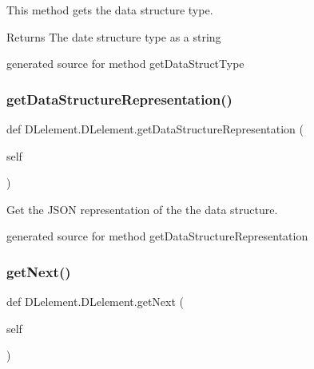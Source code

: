 This method gets the data structure type. 

\begin{DoxyReturn}{Returns}
The date structure type as a string\begin{DoxyVerb}generated source for method getDataStructType \end{DoxyVerb}
 
\end{DoxyReturn}
\hypertarget{class_d_lelement_1_1_d_lelement_aa8fbfd5aacb78c24bd181dc716dadd0a}{}\label{class_d_lelement_1_1_d_lelement_aa8fbfd5aacb78c24bd181dc716dadd0a} 
\subsubsection{\texorpdfstring{get\+Data\+Structure\+Representation()}{getDataStructureRepresentation()}}
{\footnotesize\ttfamily def D\+Lelement.\+D\+Lelement.\+get\+Data\+Structure\+Representation (\begin{DoxyParamCaption}\item[{}]{self }\end{DoxyParamCaption})}



Get the J\+S\+ON representation of the the data structure. 

\begin{DoxyVerb}generated source for method getDataStructureRepresentation \end{DoxyVerb}
 \hypertarget{class_d_lelement_1_1_d_lelement_a16aad8d30ec3393be017f3bb77349e26}{}\label{class_d_lelement_1_1_d_lelement_a16aad8d30ec3393be017f3bb77349e26} 
\subsubsection{\texorpdfstring{get\+Next()}{getNext()}}
{\footnotesize\ttfamily def D\+Lelement.\+D\+Lelement.\+get\+Next (\begin{DoxyParamCaption}\item[{}]{self }\end{DoxyParamCaption})}



